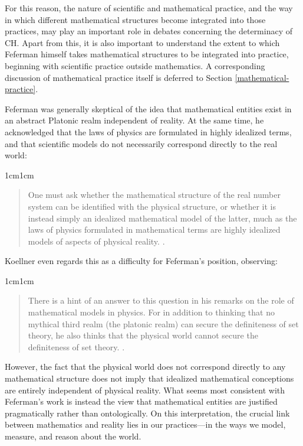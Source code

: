 \documentclass[11pt,a4paper]{book}
\theoremstyle{plain}
\begin{document}
For this reason, the nature of scientific and mathematical practice, and the way in which different mathematical structures become integrated into those practices, may play an important role in debates concerning the determinacy of CH. Apart from this, it is also important to understand the extent to which Feferman himself takes mathematical structures to be integrated into practice, beginning with scientific practice outside mathematics. A corresponding discussion of mathematical practice itself is deferred to Section \ref{mathematical-practice}.

Feferman was generally skeptical of the idea that mathematical entities exist in an abstract Platonic realm independent of reality. At the same time, he acknowledged that the laws of physics are formulated in highly idealized terms, and that scientific models do not necessarily correspond directly to the real world:

\begin{adjustwidth}{1cm}{1cm}
\begin{quote}
\small
One must ask whether the mathematical structure of the real number system can be identified with the physical structure, or whether it is instead simply an idealized mathematical model of the latter, much as the laws of physics formulated in mathematical terms are highly idealized models of aspects of physical reality. \textcite[p. 107]{Feferman1999}.
\end{quote}
\end{adjustwidth}

Koellner even regards this as a difficulty for Feferman's position, observing:

\begin{adjustwidth}{1cm}{1cm}
\begin{quote}
\small
There is a hint of an answer to this question in his remarks on the role of mathematical models in physics. For in addition to thinking that no mythical third realm (the platonic realm) can secure the definiteness of set theory, he also thinks that the physical world cannot secure the definiteness of set theory. \textcite[p. 507]{Koellner2016}.
\end{quote}
\end{adjustwidth}

However, the fact that the physical world does not correspond directly to any mathematical structure does not imply that idealized mathematical conceptions are entirely independent of physical reality. What seems most consistent with Feferman's work is instead the view that mathematical entities are justified pragmatically rather than ontologically. On this interpretation, the crucial link between mathematics and reality lies in our practices—in the ways we model, measure, and reason about the world.
\end{document}

